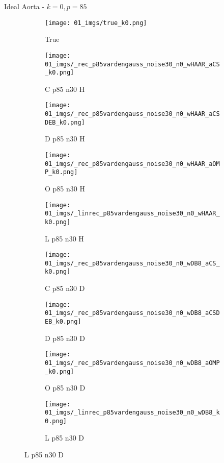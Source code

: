 \begin{frame}{Ideal Aorta - $k=0,p=85$}{}
\begin{figure}
\begin{subfigure}{0.1\textwidth}
\texttt{[image: 01\_imgs/true\_k0.png]}
\caption*{\Tiny True}
\end{subfigure}
\begin{subfigure}{0.1\textwidth}
\texttt{[image: 01\_imgs/\_rec\_p85vardengauss\_noise30\_n0\_wHAAR\_aCS\_k0.png]}
\caption*{\Tiny C p85 n30 H}
\end{subfigure}
\begin{subfigure}{0.1\textwidth}
\texttt{[image: 01\_imgs/\_rec\_p85vardengauss\_noise30\_n0\_wHAAR\_aCSDEB\_k0.png]}
\caption*{\Tiny D p85 n30 H}
\end{subfigure}
\begin{subfigure}{0.1\textwidth}
\texttt{[image: 01\_imgs/\_rec\_p85vardengauss\_noise30\_n0\_wHAAR\_aOMP\_k0.png]}
\caption*{\Tiny O p85 n30 H}
\end{subfigure}
\begin{subfigure}{0.1\textwidth}
\texttt{[image: 01\_imgs/\_linrec\_p85vardengauss\_noise30\_n0\_wHAAR\_k0.png]}
\caption*{\Tiny L p85 n30 H}
\end{subfigure}
\begin{subfigure}{0.1\textwidth}
\texttt{[image: 01\_imgs/\_rec\_p85vardengauss\_noise30\_n0\_wDB8\_aCS\_k0.png]}
\caption*{\Tiny C p85 n30 D}
\end{subfigure}
\begin{subfigure}{0.1\textwidth}
\texttt{[image: 01\_imgs/\_rec\_p85vardengauss\_noise30\_n0\_wDB8\_aCSDEB\_k0.png]}
\caption*{\Tiny D p85 n30 D}
\end{subfigure}
\begin{subfigure}{0.1\textwidth}
\texttt{[image: 01\_imgs/\_rec\_p85vardengauss\_noise30\_n0\_wDB8\_aOMP\_k0.png]}
\caption*{\Tiny O p85 n30 D}
\end{subfigure}
\begin{subfigure}{0.1\textwidth}
\texttt{[image: 01\_imgs/\_linrec\_p85vardengauss\_noise30\_n0\_wDB8\_k0.png]}
\caption*{\Tiny L p85 n30 D}
\end{subfigure}
\end{figure}
\end{frame}

